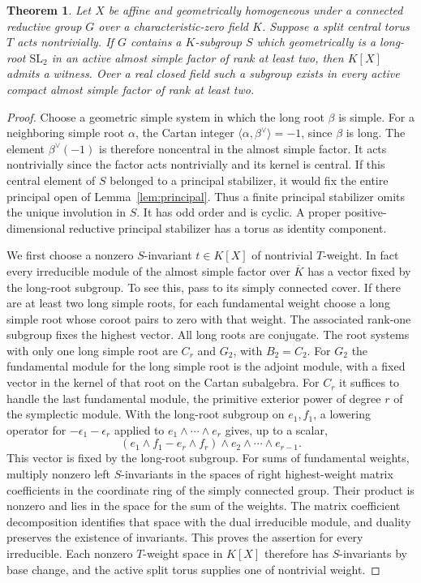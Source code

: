 \documentclass[11pt]{article}
\newtheorem{theorem}{Theorem}[section]
\newcommand{\SL}{\mathrm{SL}}
\begin{document}
\begin{theorem}\label{thm:longroot}
Let \(X\) be affine and geometrically homogeneous under a connected
reductive group \(G\) over a characteristic-zero field \(K\).
Suppose a split central torus \(T\) acts nontrivially. If \(G\) contains
a \(K\)-subgroup \(S\) which geometrically is a long-root \(\SL_2\)
in an active almost simple factor of rank at least two, then \(K[X]\)
admits a witness. Over a real closed field such a subgroup exists
in every active compact almost simple factor of rank at least two.
\end{theorem}

\begin{proof}
Choose a geometric simple system in which the long root \(\beta\)
is simple.
For a neighboring simple root \(\alpha\), the Cartan integer
\(\langle\alpha,\beta^\vee\rangle=-1\), since \(\beta\) is long.
The element \(\beta^\vee(-1)\) is therefore noncentral in the
almost simple factor. It acts nontrivially since the factor acts
nontrivially and its kernel is central. If this central element
of \(S\) belonged to a principal stabilizer, it would fix the
entire principal open of Lemma~\ref{lem:principal}. Thus a finite
principal stabilizer omits the unique involution in \(S\). It has
odd order and is cyclic. A proper positive-dimensional reductive
principal stabilizer has a torus as identity component.

We first choose a nonzero \(S\)-invariant \(t\in K[X]\) of
nontrivial \(T\)-weight. In fact every irreducible module of the
almost simple factor over \(\overline K\) has a vector fixed by the long-root
subgroup. To see this, pass to its simply connected cover. If
there are at least two long simple roots, for each fundamental
weight choose a long simple root whose coroot pairs to zero with
that weight. The associated rank-one subgroup fixes the highest
vector. All long roots are conjugate. The root systems with only
one long simple root are \(C_r\) and \(G_2\), with \(B_2=C_2\).
For \(G_2\) the fundamental module for the long simple root is
the adjoint module, with a fixed vector in the kernel of that
root on the Cartan subalgebra. For \(C_r\) it suffices to handle
the last fundamental module, the primitive exterior power of
degree \(r\) of the symplectic module. With the long-root subgroup
on \(e_1,f_1\), a lowering operator for \(-\epsilon_1-\epsilon_r\)
applied to \(e_1\wedge\cdots\wedge e_r\) gives, up to a scalar,
\[
 (e_1\wedge f_1-e_r\wedge f_r)\wedge e_2\wedge\cdots\wedge e_{r-1}.
\]
This vector is fixed by the long-root subgroup. For sums of
fundamental weights, multiply nonzero left \(S\)-invariants in
the spaces of right highest-weight matrix coefficients in the
coordinate ring of the simply connected group. Their product
is nonzero and lies in the space for the sum of the weights.
The matrix coefficient decomposition identifies that space
with the dual irreducible module, and duality preserves
the existence of invariants. This proves the assertion for
every irreducible. Each nonzero \(T\)-weight space in \(K[X]\)
therefore has \(S\)-invariants by base change, and the active
split torus supplies one of nontrivial weight.


\end{proof}
\end{document}
